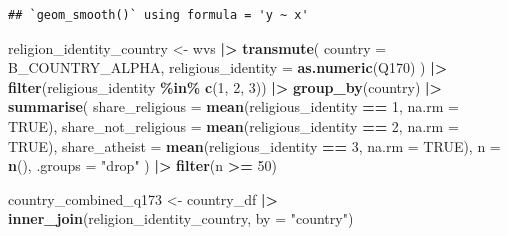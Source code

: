 \documentclass[
]{article}
\newenvironment{Shaded}{\begin{snugshade}}{\end{snugshade}}
\newcommand{\AttributeTok}[1]{\textcolor[rgb]{0.13,0.29,0.53}{#1}}
\newcommand{\ConstantTok}[1]{\textcolor[rgb]{0.56,0.35,0.01}{#1}}
\newcommand{\DecValTok}[1]{\textcolor[rgb]{0.00,0.00,0.81}{#1}}
\newcommand{\FunctionTok}[1]{\textcolor[rgb]{0.13,0.29,0.53}{\textbf{#1}}}
\newcommand{\NormalTok}[1]{#1}
\newcommand{\OtherTok}[1]{\textcolor[rgb]{0.56,0.35,0.01}{#1}}
\newcommand{\SpecialCharTok}[1]{\textcolor[rgb]{0.81,0.36,0.00}{\textbf{#1}}}
\newcommand{\StringTok}[1]{\textcolor[rgb]{0.31,0.60,0.02}{#1}}
\begin{document}
\begin{verbatim}
## `geom_smooth()` using formula = 'y ~ x'
\end{verbatim}

\begin{Shaded}
\begin{Highlighting}[]
\NormalTok{religion\_identity\_country }\OtherTok{\textless{}{-}}\NormalTok{ wvs }\SpecialCharTok{|\textgreater{}}
  \FunctionTok{transmute}\NormalTok{(}
    \AttributeTok{country =}\NormalTok{ B\_COUNTRY\_ALPHA,}
    \AttributeTok{religious\_identity =} \FunctionTok{as.numeric}\NormalTok{(Q170)}
\NormalTok{  ) }\SpecialCharTok{|\textgreater{}}
  \FunctionTok{filter}\NormalTok{(religious\_identity }\SpecialCharTok{\%in\%} \FunctionTok{c}\NormalTok{(}\DecValTok{1}\NormalTok{, }\DecValTok{2}\NormalTok{, }\DecValTok{3}\NormalTok{)) }\SpecialCharTok{|\textgreater{}}
  \FunctionTok{group\_by}\NormalTok{(country) }\SpecialCharTok{|\textgreater{}}
  \FunctionTok{summarise}\NormalTok{(}
    \AttributeTok{share\_religious =} \FunctionTok{mean}\NormalTok{(religious\_identity }\SpecialCharTok{==} \DecValTok{1}\NormalTok{, }\AttributeTok{na.rm =} \ConstantTok{TRUE}\NormalTok{),}
    \AttributeTok{share\_not\_religious =} \FunctionTok{mean}\NormalTok{(religious\_identity }\SpecialCharTok{==} \DecValTok{2}\NormalTok{, }\AttributeTok{na.rm =} \ConstantTok{TRUE}\NormalTok{),}
    \AttributeTok{share\_atheist =} \FunctionTok{mean}\NormalTok{(religious\_identity }\SpecialCharTok{==} \DecValTok{3}\NormalTok{, }\AttributeTok{na.rm =} \ConstantTok{TRUE}\NormalTok{),}
    \AttributeTok{n =} \FunctionTok{n}\NormalTok{(),}
    \AttributeTok{.groups =} \StringTok{"drop"}
\NormalTok{  ) }\SpecialCharTok{|\textgreater{}}
  \FunctionTok{filter}\NormalTok{(n }\SpecialCharTok{\textgreater{}=} \DecValTok{50}\NormalTok{)}


\NormalTok{country\_combined\_q173 }\OtherTok{\textless{}{-}}\NormalTok{ country\_df }\SpecialCharTok{|\textgreater{}}
  \FunctionTok{inner\_join}\NormalTok{(religion\_identity\_country, }\AttributeTok{by =} \StringTok{"country"}\NormalTok{)}



\end{Highlighting}
\end{Shaded}
\end{document}

